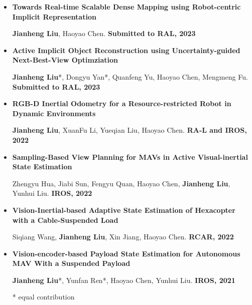 \documentclass[11pt,a4paper,sans]{moderncv}        %
\begin{document}
\begin{itemize}

    \item{\textbf{Towards Real-time Scalable Dense Mapping using Robot-centric Implicit Representation}

    \small{\textbf{Jianheng Liu}, Haoyao Chen. \textbf{Submitted to RAL, 2023}}
    }
    
    \vspace{3pt}

    \item{\textbf{Active Implicit Object Reconstruction using Uncertainty-guided Next-Best-View Optimziation}

    \small{\textbf{Jianheng Liu}*, Dongyu Yan*, Quanfeng Yu, Haoyao Chen, Mengmeng Fu. \textbf{Submitted to RAL, 2023}}
    }
    
    \vspace{3pt}


    \item{\textbf{RGB-D Inertial Odometry for a Resource-restricted Robot in Dynamic Environments}

    \small{\textbf{Jianheng Liu}, XuanFu Li, Yueqian Liu, Haoyao Chen. \textbf{RA-L and IROS, 2022}}
    }

    \vspace{3pt}

    \item{\textbf{Sampling-Based View Planning for MAVs in Active Visual-inertial State Estimation}

    \small{Zhengyu Hua, Jiabi Sun, Fengyu Quan, Haoyao Chen, \textbf{Jianheng Liu}, Yunhui Liu. \textbf{IROS, 2022}}
    }

    \vspace{3pt}

    
    \item{\textbf{Vision-Inertial-based Adaptive State Estimation of Hexacopter with a Cable-Suspended Load}

    \small{Siqiang Wang, \textbf{Jianheng Liu}, Xin Jiang, Haoyao Chen. \textbf{RCAR, 2022}}
    }

    \vspace{3pt}
    

    \item{\textbf{Vision-encoder-based Payload State Estimation for Autonomous MAV With a Suspended Payload}

    \small{\textbf{Jianheng Liu}*, Yunfan Ren*, Haoyao Chen, Yunhui Liu. \textbf{IROS, 2021}}
    }

\footnotesize{* equal contribution}

\end{itemize}
\end{document}
